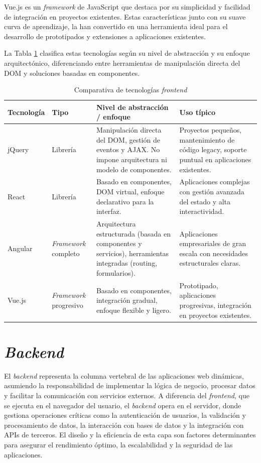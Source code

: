 Vue.js es un \textit{framework} de JavaScript que destaca por su simplicidad y facilidad de integración en proyectos existentes. Estas características junto con su suave curva de aprendizaje, la han convertido en una herramienta ideal para el desarrollo de prototipados y extensiones a aplicaciones existentes. 

La Tabla \ref{tab:frontend_technologies} clasifica estas tecnologías según su nivel de abstracción y su enfoque arquitectónico, diferenciando entre herramientas de manipulación directa del DOM y soluciones basadas en componentes.

\begin{table}[h!]
\centering
\small
\begin{tabularx}{\textwidth}{X X X p{4.5cm}}
\toprule
\textbf{Tecnología} & \textbf{Tipo} & \textbf{Nivel de abstracción / enfoque} & \textbf{Uso típico} \\
\midrule
jQuery & Librería & Manipulación directa del DOM, gestión de eventos y AJAX. No impone arquitectura ni modelo de componentes. & Proyectos pequeños, mantenimiento de código legacy, soporte puntual en aplicaciones existentes. \\
\midrule
React & Librería & Basado en componentes, DOM virtual, enfoque declarativo para la interfaz. & Aplicaciones complejas con gestión avanzada del estado y alta interactividad. \\
\midrule
Angular & \textit{Framework} completo & Arquitectura estructurada (basada en componentes y servicios), herramientas integradas (routing, formularios). & Aplicaciones empresariales de gran escala con necesidades estructurales claras. \\
\midrule
Vue.js & \textit{Framework} progresivo & Basado en componentes, integración gradual, enfoque flexible y ligero. & Prototipado, aplicaciones progresivas, integración en proyectos existentes. \\
\bottomrule
\end{tabularx}
\caption{Comparativa de tecnologías \textit{frontend}}
\label{tab:frontend_technologies}
\end{table}


\section{\textit{Backend}}

El \textit{backend} representa la columna vertebral de las aplicaciones web dinámicas, asumiendo la responsabilidad de implementar la lógica de negocio, procesar datos y facilitar la comunicación con servicios externos. A diferencia del \textit{frontend}, que se ejecuta en el navegador del usuario, el \textit{backend} opera en el servidor, donde gestiona operaciones críticas como la autenticación de usuarios, la validación y procesamiento de datos, la interacción con bases de datos y la integración con APIs de terceros. El diseño y la eficiencia de esta capa son factores determinantes para asegurar el rendimiento óptimo, la escalabilidad y la seguridad de las aplicaciones.

